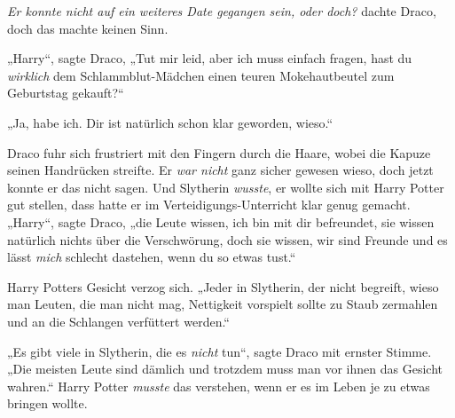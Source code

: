 \emph{Er konnte nicht auf ein weiteres Date gegangen sein, oder doch?} dachte Draco, doch das machte keinen Sinn.

„Harry“, sagte Draco, „Tut mir leid, aber ich muss einfach fragen, hast du \emph{wirklich} dem Schlammblut-Mädchen einen teuren Mokehautbeutel zum Geburtstag gekauft?“

„Ja, habe ich. Dir ist natürlich schon klar geworden, wieso.“

Draco fuhr sich frustriert mit den Fingern durch die Haare, wobei die Kapuze seinen Handrücken streifte. Er \emph{war nicht} ganz sicher gewesen wieso, doch jetzt konnte er das nicht sagen. Und Slytherin \emph{wusste}, er wollte sich mit Harry Potter gut stellen, dass hatte er im Verteidigungs-Unterricht klar genug gemacht. „Harry“, sagte Draco, „die Leute wissen, ich bin mit dir befreundet, sie wissen natürlich nichts über die Verschwörung, doch sie wissen, wir sind Freunde und es lässt \emph{mich} schlecht dastehen, wenn du so etwas tust.“

Harry Potters Gesicht verzog sich. „Jeder in Slytherin, der nicht begreift, wieso man Leuten, die man nicht mag, Nettigkeit vorspielt sollte zu Staub zermahlen und an die Schlangen verfüttert werden.“

„Es gibt viele in Slytherin, die es \emph{nicht} tun“, sagte Draco mit ernster Stimme. „Die meisten Leute sind dämlich und trotzdem muss man vor ihnen das Gesicht wahren.“ Harry Potter \emph{musste} das verstehen, wenn er es im Leben je zu etwas bringen wollte.

